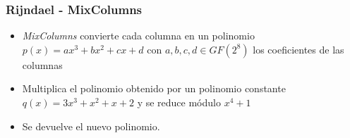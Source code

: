 \documentclass{beamer}
\begin{document}
	\begin{frame}
	\frametitle{Rijndael - MixColumns}
	\begin{itemize}
		\item \textit{MixColumns} convierte cada columna en un polinomio $p(x) = ax^3 + bx^2 + cx + d$ con $a, b, c, d \in \textit{GF}(2^8)$ los coeficientes de las columnas
	
		\item Multiplica el polinomio obtenido por un polinomio constante $q(x) = 3x^3 + x^2 + x + 2$ y se reduce módulo $x^4 + 1$
		
		\item Se devuelve el nuevo polinomio.
		
	\end{itemize}

	\end{frame}
\end{document}
